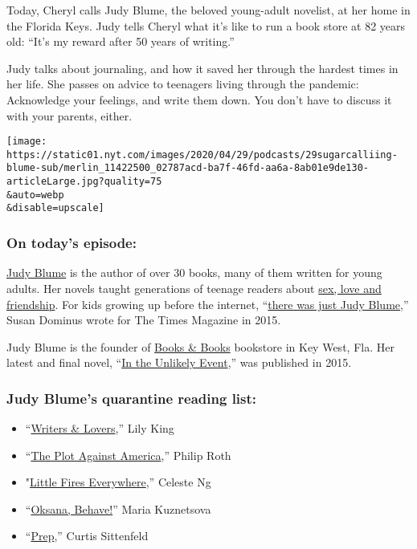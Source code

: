 Today, Cheryl calls Judy Blume, the beloved young-adult novelist, at her
home in the Florida Keys. Judy tells Cheryl what it's like to run a book
store at 82 years old: ``It's my reward after 50 years of writing.''

Judy talks about journaling, and how it saved her through the hardest
times in her life. She passes on advice to teenagers living through the
pandemic: Acknowledge your feelings, and write them down. You don't have
to discuss it with your parents, either.

\texttt{[image: https://static01.nyt.com/images/2020/04/29/podcasts/29sugarcalliing-blume-sub/merlin\_11422500\_02787acd-ba7f-46fd-aa6a-8ab01e9de130-articleLarge.jpg?quality=75\\\&auto=webp\\\&disable=upscale]}

\hypertarget{on-todays-episode}{%
\subsubsection{\texorpdfstring{\textbf{On today's
episode:}}{On today's episode:}}\label{on-todays-episode}}

\href{http://www.judyblume.com/}{Judy Blume} is the author of over 30
books, many of them written for young adults. Her novels taught
generations of teenage readers about
\href{https://www.nytimes.com/2015/06/02/books/what-judy-blumes-books-meant.html}{sex,
love and friendship}. For kids growing up before the internet,
``\href{https://www.nytimes.com/2015/05/24/magazine/judy-blume-knows-all-your-secrets.html}{there
was just Judy Blume},'' Susan Dominus wrote for The Times Magazine in
2015.

Judy Blume is the founder of \href{http://booksandbookskw.com/}{Books \&
Books} bookstore in Key West, Fla. Her latest and final novel,
``\href{https://www.nytimes.com/2015/05/31/books/review/judy-blumes-in-the-unlikely-event.html}{In
the Unlikely Event},'' was published in 2015.

\hypertarget{judy-blumes-quarantine-reading-list}{%
\subsubsection{\texorpdfstring{\textbf{Judy Blume's quarantine reading
list:}}{Judy Blume's quarantine reading list:}}\label{judy-blumes-quarantine-reading-list}}

\begin{itemize}
\item
  ``\href{https://www.amazon.com/Writers-Lovers-Lily-King/dp/0802148530}{Writers
  \& Lovers},'' Lily King
\item
  ``\href{https://www.amazon.com/Plot-Against-America-Philip-Roth/dp/1400079497}{The
  Plot Against America},'' Philip Roth
\item
  "\href{https://www.amazon.com/Little-Fires-Everywhere-Celeste-Ng/dp/0735224293}{Little
  Fires Everywhere},'' Celeste Ng
\item
  ``\href{https://www.amazon.com/Oksana-Behave-Novel-Maria-Kuznetsova/dp/0525511873}{Oksana,
  Behave!}'' Maria Kuznetsova
\item
  ``\href{https://www.amazon.com/Prep-Novel-Curtis-Sittenfeld/dp/081297235X}{Prep},''
  Curtis Sittenfeld
\end{itemize}

